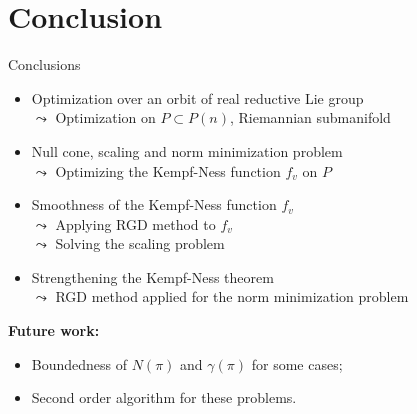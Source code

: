 \documentclass{beamer}
\begin{document}

	\section{Conclusion}

	\begin{frame}{Conclusions}
		\begin{itemize}
			\item Optimization over an orbit of real reductive Lie group\\ $\leadsto$ Optimization on $P \subset P(n)$, Riemannian submanifold
			\item Null cone, scaling and norm minimization problem \\ $\leadsto$ Optimizing the Kempf-Ness function $f_v$ on $P$
			\item Smoothness of the Kempf-Ness function $f_v$ \\ $\leadsto$ Applying RGD method to $f_v$ \\$\leadsto$ Solving the scaling problem
			\item Strengthening the Kempf-Ness theorem \\ $\leadsto$ RGD method applied for the norm minimization problem
		\end{itemize}

		\textbf{Future work:}
		\begin{itemize}
			\item Boundedness of $N(\pi)$ and $\gamma(\pi)$ for some cases;
			\item Second order algorithm for these problems.
		\end{itemize}
	\end{frame}
\end{document}
